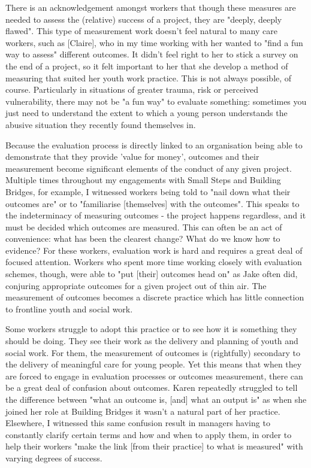 There is an acknowledgement amongst workers that though these measures are needed to assess the (relative) success of a project, they are "deeply, deeply flawed". This type of measurement work doesn't feel natural to many care workers, such as [Claire], who in my time working with her wanted to "find a fun way to assess" different outcomes. It didn't feel right to her to stick a survey on the end of a project, so it felt important to her that she develop a method of measuring that suited her youth work practice. This is not always possible, of course. Particularly in situations of greater trauma, risk or perceived vulnerability, there may not be "a fun way" to evaluate something: sometimes you just need to understand the extent to which a young person understands the abusive situation they recently found themselves in.

Because the evaluation process is directly linked to an organisation being able to demonstrate that they provide 'value for money', outcomes and their measurement become significant elements of the conduct of any given project. Multiple times throughout my engagements with Small Steps and Building Bridges, for example, I witnessed workers being told to "nail down what their outcomes are" or to "familiarise [themselves] with the outcomes". This speaks to the indeterminacy of measuring outcomes - the project happens regardless, and it must be decided which outcomes are measured. This can often be an act of convenience: what has been the clearest change? What do we know how to evidence? For these workers, evaluation work is hard and requires a great deal of focused attention. Workers who spent more time working closely with evaluation schemes, though, were able to "put [their] outcomes head on" as Jake often did, conjuring appropriate outcomes for a given project out of thin air. The measurement of outcomes becomes a discrete practice which has little connection to frontline youth and social work.

Some workers struggle to adopt this practice or to see how it is something they should be doing. They see their work as the delivery and planning of youth and social work. For them, the measurement of outcomes is (rightfully) secondary to the delivery of meaningful care for young people. Yet this means that when they are forced to engage in evaluation processes or outcomes measurement, there can be a great deal of confusion about outcomes. Karen repeatedly struggled to tell the difference between "what an outcome is, [and] what an output is" as when she joined her role at Building Bridges it wasn't a natural part of her practice. Elsewhere, I witnessed this same confusion result in managers having to constantly clarify certain terms and how and when to apply them, in order to help their workers "make the link [from their practice] to what is measured" with varying degrees of success.

